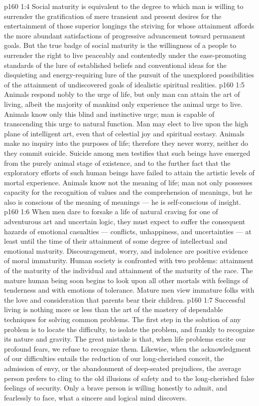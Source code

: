\vs p160 1:4 Social maturity is equivalent to the degree to which man is willing to surrender the gratification of mere transient and present desires for the entertainment of those superior longings the striving for whose attainment affords the more abundant satisfactions of progressive advancement toward permanent goals. But the true badge of social maturity is the willingness of a people to surrender the right to live peaceably and contentedly under the ease\hyp{}promoting standards of the lure of established beliefs and conventional ideas for the disquieting and energy\hyp{}requiring lure of the pursuit of the unexplored possibilities of the attainment of undiscovered goals of idealistic spiritual realities.
\vs p160 1:5 Animals respond nobly to the urge of life, but only man can attain the art of living, albeit the majority of mankind only experience the animal urge to live. Animals know only this blind and instinctive urge; man is capable of transcending this urge to natural function. Man may elect to live upon the high plane of intelligent art, even that of celestial joy and spiritual ecstasy. Animals make no inquiry into the purposes of life; therefore they never worry, neither do they commit suicide. Suicide among men testifies that such beings have emerged from the purely animal stage of existence, and to the further fact that the exploratory efforts of such human beings have failed to attain the artistic levels of mortal experience. Animals know not the meaning of life; man not only possesses capacity for the recognition of values and the comprehension of meanings, but he also is conscious of the meaning of meanings --- he is self\hyp{}conscious of insight.
\vs p160 1:6 When men dare to forsake a life of natural craving for one of adventurous art and uncertain logic, they must expect to suffer the consequent hazards of emotional casualties --- conflicts, unhappiness, and uncertainties --- at least until the time of their attainment of some degree of intellectual and emotional maturity. Discouragement, worry, and indolence are positive evidence of moral immaturity. Human society is confronted with two problems: attainment of the maturity of the individual and attainment of the maturity of the race. The mature human being soon begins to look upon all other mortals with feelings of tenderness and with emotions of tolerance. Mature men view immature folks with the love and consideration that parents bear their children.
\vs p160 1:7 Successful living is nothing more or less than the art of the mastery of dependable techniques for solving common problems. The first step in the solution of any problem is to locate the difficulty, to isolate the problem, and frankly to recognize its nature and gravity. The great mistake is that, when life problems excite our profound fears, we refuse to recognize them. Likewise, when the acknowledgment of our difficulties entails the reduction of our long\hyp{}cherished conceit, the admission of envy, or the abandonment of deep\hyp{}seated prejudices, the average person prefers to cling to the old illusions of safety and to the long\hyp{}cherished false feelings of security. Only a brave person is willing honestly to admit, and fearlessly to face, what a sincere and logical mind discovers.
